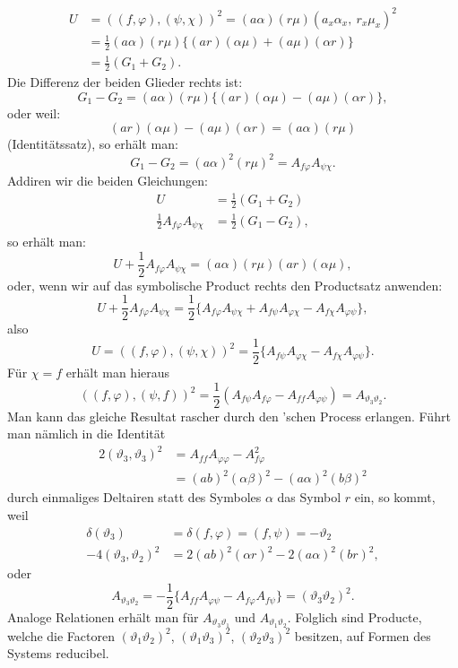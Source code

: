 \documentclass[11pt]{article}
\providecommand{\gesperrt}[1]{\textls[130]{#1}}
\providecommand{\weq}[2]{\begin{equation}\tag{#1}#2\end{equation}}
\begin{document}
\[
\begin{aligned}
U &= ((f,\varphi),(\psi,\chi))^2 = (a\alpha)(r\mu)(a_x\alpha_x,\ r_x\mu_x)^2\\
&= \frac{1}{2}(a\alpha)(r\mu)\{(ar)(\alpha\mu)+(a\mu)(\alpha r)\}\\
&= \frac{1}{2}(G_1+G_2).
\end{aligned}
\]
Die Differenz der beiden Glieder rechts ist:
\[
G_1-G_2=(a\alpha)(r\mu)\{(ar)(\alpha\mu)-(a\mu)(\alpha r)\},
\]
oder weil:
\[
(ar)(\alpha\mu)-(a\mu)(\alpha r)=(a\alpha)(r\mu)
\]
(Identit\"atssatz), so erh\"alt man:
\[
G_1-G_2=(a\alpha)^2(r\mu)^2=A_{f\varphi}A_{\psi\chi}.
\]
Addiren wir die beiden Gleichungen:
\[
\begin{aligned}
U &= \frac{1}{2}(G_1+G_2)\\
\frac{1}{2}A_{f\varphi}A_{\psi\chi} &= \frac{1}{2}(G_1-G_2),
\end{aligned}
\]
so erh\"alt man:
\[
U+\frac{1}{2}A_{f\varphi}A_{\psi\chi}=(a\alpha)(r\mu)(ar)(\alpha\mu),
\]
oder, wenn wir auf das symbolische Product rechts den Productsatz anwenden:
\[
U+\frac{1}{2}A_{f\varphi}A_{\psi\chi}=\frac{1}{2}\{A_{f\varphi}A_{\psi\chi}+A_{f\psi}A_{\varphi\chi}-A_{f\chi}A_{\varphi\psi}\},
\]
also
\weq{II}{U=((f,\varphi),(\psi,\chi))^2=\frac{1}{2}\{A_{f\psi}A_{\varphi\chi}-A_{f\chi}A_{\varphi\psi}\}.}
F\"ur $\chi=f$ erh\"alt man hieraus
\[
((f,\varphi),(\psi,f))^2=\frac{1}{2}(A_{f\psi}A_{f\varphi}-A_{ff}A_{\varphi\psi})=A_{\vartheta_3\vartheta_2}.
\]
Man kann das gleiche Resultat rascher durch den \gesperrt{Aronhold}'schen Process erlangen. F\"uhrt man n\"amlich in die Identit\"at
\[
\begin{aligned}
2(\vartheta_3,\vartheta_3)^2 &= A_{ff}A_{\varphi\varphi}-A_{f\varphi}^2\\
&= (ab)^2(\alpha\beta)^2-(a\alpha)^2(b\beta)^2
\end{aligned}
\]
durch einmaliges Deltairen statt des Symboles $\alpha$ das Symbol $r$ ein, so kommt, weil
\[
\begin{aligned}
\delta(\vartheta_3) &= \delta(f,\varphi)=(f,\psi)=-\vartheta_2\\
-4(\vartheta_3,\vartheta_2)^2 &= 2(ab)^2(\alpha r)^2-2(a\alpha)^2(br)^2,
\end{aligned}
\]
oder
\weq{III}{A_{\vartheta_3\vartheta_2}=-\frac{1}{2}\{A_{ff}A_{\varphi\psi}-A_{f\varphi}A_{f\psi}\}=(\vartheta_3\vartheta_2)^2.}
Analoge Relationen erh\"alt man f\"ur $A_{\vartheta_3\vartheta_1}$ und $A_{\vartheta_1\vartheta_2}$. Folglich sind Producte, welche die Factoren $(\vartheta_1\vartheta_2)^2$, $(\vartheta_1\vartheta_3)^2$, $(\vartheta_2\vartheta_3)^2$ besitzen, auf Formen des Systems reducibel.
\end{document}
